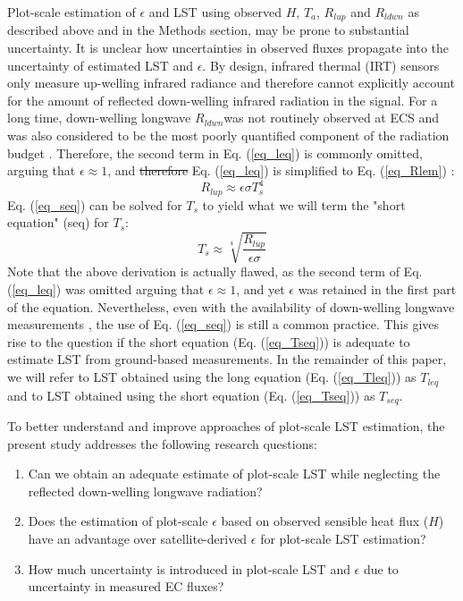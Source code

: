 \documentclass[fleqn,10pt]{wlscirep}
\providecommand{\DIFaddtex}[1]{{\protect\color{blue}\uwave{#1}}} %
\providecommand{\DIFdeltex}[1]{{\protect\color{red}\sout{#1}}}                      %
\providecommand{\DIFaddbegin}{} %
\providecommand{\DIFaddend}{} %
\providecommand{\DIFdelbegin}{} %
\providecommand{\DIFdelend}{} %
\providecommand{\DIFadd}[1]{\texorpdfstring{\DIFaddtex{#1}}{#1}} %
\providecommand{\DIFdel}[1]{\texorpdfstring{\DIFdeltex{#1}}{}} %
\begin{document}
Plot-scale estimation of $\epsilon$ and LST using observed $H$, $T_{a}$, $R_{lup}$ and $R_{ldwn}$ as described above and in the Methods section, may be prone to substantial uncertainty. It is unclear how uncertainties in observed fluxes propagate into the uncertainty of estimated LST and $\epsilon$. By design, infrared thermal (IRT) sensors only measure up-welling infrared radiance and therefore cannot explicitly account for the amount of reflected down-welling infrared radiation in the signal. For a long time, down-welling longwave \DIFaddbegin \DIFadd{(}\DIFaddend $R_{ldwn}$\DIFaddbegin \DIFadd{) }\DIFaddend was not routinely observed at ECS \cite{wang2009evaluation} and was also considered to be the most poorly quantified component of the radiation budget \cite{trenberth2012tracking}. Therefore, the second term in Eq. (\ref{eq_leq}) is commonly omitted, arguing that $\epsilon\approx 1$, and \DIFdelbegin \DIFdel{therefore }\DIFdelend \DIFaddbegin \DIFadd{hence, }\DIFaddend Eq. (\ref{eq_leq}) is simplified to Eq. (\ref{eq_Rlem}) \cite{crago2014use}:
\begin{equation}\label{eq_seq}
R_{lup} \approx  \epsilon \sigma T_{s}^{4}                
\end{equation} 
Eq. (\ref{eq_seq}) can be solved for $T_s$ to yield what we will term the "short equation" (seq) for $T_s$:
\begin{equation}\label{eq_Tseq}
T_{s} \approx \sqrt[4]{\frac{R_{lup}}{\epsilon \sigma}}
\end{equation} 
Note that the above derivation is actually flawed, as the second term of Eq. (\ref{eq_leq}) was omitted arguing that $\epsilon\approx 1$, and yet $\epsilon$ was retained in the first part of the equation. Nevertheless, even with the availability of down-welling longwave measurements \cite{stephens1995review}, the use of Eq. (\ref{eq_seq}) is still a common practice\cite{crago2014use,mallick2018bridging}. This gives rise to the question if the short equation (Eq. (\ref{eq_Tseq})) is adequate to estimate LST from ground-based measurements. In the remainder of this paper, we will refer to LST obtained using the long equation (Eq. (\ref{eq_Tleq})) as $T_{leq}$ and to LST obtained using the short equation (Eq. (\ref{eq_Tseq})) as $T_{seq}$.

To better understand and improve approaches of plot-scale LST estimation, the present study addresses the following research questions:
\begin{enumerate}
	\item Can we obtain an adequate estimate of plot-scale LST while neglecting the reflected down-welling longwave radiation?
	\item Does the estimation of plot-scale $\epsilon$ based on observed sensible heat flux ($H$) have an advantage over satellite-derived $\epsilon$ for plot-scale LST estimation?   
    \item How much uncertainty is introduced in plot-scale LST and $\epsilon$ due to uncertainty in measured EC fluxes?    
\end{enumerate}    
\end{document}
